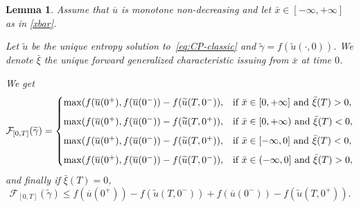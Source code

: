 \documentclass[a4paper, 10pt, final]{article}
\newtheorem{lemma}{Lemma}[section]
\begin{document}
\begin{lemma} 
  \label{lemmashock}
  Assume that $\overline u $  is  monotone non-decreasing and let  $\bar x\in[-\infty, +\infty]$ as in \eqref{xbar}.
  
Let $\widetilde u$ be the unique entropy solution to~\eqref{eq:CP-classic} and $\widetilde \gamma= f(\widetilde u(\cdot, 0))$. 
We denote $\bar \xi$ the unique forward generalized characteristic issuing from  $\bar x$ at time $0$.
  
We get 
  \begin{equation}
    \label{funzionalecasoshock}
    \mathcal F_{[0,T]}(\widetilde \gamma)=
    \begin{cases} \max(f(\overline u(0^+), f(\overline u(0^-)) - f(\widetilde u(T,0^-)),
      & 
     \textrm{if }   \bar x\in [0, +\infty] \textrm{ and }\bar \xi(T)> 0,
      \vspace{.2cm}
      \\ \max(f(\overline u(0^+), f(\overline u(0^-)) - f(\widetilde u(T,0^+)),
      & 
     \textrm{if }   \bar x\in [0, +\infty) \textrm{ and }\bar \xi(T)< 0,
      \vspace{.2cm}
      \\\vspace{.2cm}
      \max(f(\overline u(0^+), f(\overline u(0^-)) - f(\widetilde u(T,0^+)),
      & \textrm{if }   \bar x\in [-\infty,0] \textrm{ and }\bar \xi(T)< 0,    \\
      \max(f(\overline u(0^+), f(\overline u(0^-)) - f(\widetilde u(T,0^-)),

      & 
   \textrm{if }   \bar x\in (-\infty,0] \textrm{ and }\bar \xi(T)> 0,
      
    \end{cases} 
  \end{equation} 
  and finally if $\bar \xi(T)= 0$,
  \begin{equation}\label{zero}\mathcal F_{[0,T]}(\widetilde \gamma)\leq f(\overline u(0^+)) - f(\widetilde u(T,0^-)) +f(\overline u(0^-)) 
    - f(\widetilde u(T,0^+)).\end{equation}
  \end{lemma} 
\end{document}
